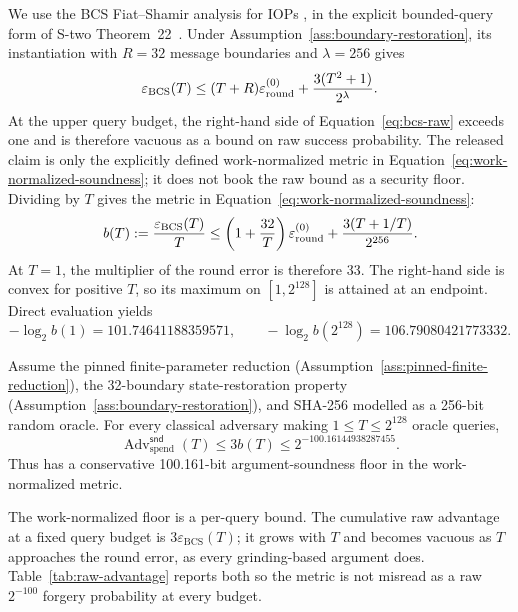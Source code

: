 We use the BCS Fiat--Shamir analysis for IOPs
\cite{BenSassonChiesaSpooner2016}, in the explicit bounded-query form of
S-two Theorem~22~\cite{CarmonEtAl2026Stwo}.  Under
Assumption~\ref{ass:boundary-restoration}, its instantiation with \(R=32\)
message boundaries and \(\lambda=256\) gives
\begin{equation}
 \varepsilon_{\mathrm{BCS}}(T)
 \le (T+R)\varepsilon_{\rm round}^{(0)}
       +\frac{3(T^2+1)}{2^\lambda}.
 \label{eq:bcs-raw}
\end{equation}
At the upper query budget, the right-hand side of
Equation~\eqref{eq:bcs-raw} exceeds one and is therefore vacuous as a bound
on raw success probability.  The released claim is only the explicitly
defined work-normalized metric in
Equation~\eqref{eq:work-normalized-soundness}; it does not book the raw bound
as a security floor.
Dividing by \(T\) gives the metric in
Equation~\eqref{eq:work-normalized-soundness}:
\begin{equation}
 b(T):=\frac{\varepsilon_{\mathrm{BCS}}(T)}{T}
 \le
 \left(1+\frac{32}{T}\right)\varepsilon_{\rm round}^{(0)}
 +\frac{3(T+1/T)}{2^{256}}.
 \label{eq:bcs-normalized}
\end{equation}
At \(T=1\), the multiplier of the round error is therefore 33.  The
right-hand side is convex for positive \(T\), so its maximum on
\([1,2^{128}]\) is attained at an endpoint.  Direct evaluation yields
\[
 -\log_2 b(1)=101.74641188359571,
 \qquad
 -\log_2 b(2^{128})=106.79080421773332.
\]

\begin{theorem}
\label{thm:bcs-soundness}
Assume the pinned finite-parameter reduction
(Assumption~\ref{ass:pinned-finite-reduction}), the 32-boundary
state-restoration property (Assumption~\ref{ass:boundary-restoration}), and
SHA-256 modelled as a 256-bit random oracle.  For every classical adversary making
\(1\le T\le2^{128}\) oracle queries,
\[
 \operatorname{Adv}^{\mathsf{snd}}_{\mathrm{spend}}(T)
 \le 3b(T)\le 2^{-100.16144938287455}.
\]
Thus \Profile{} has a conservative 100.161-bit argument-soundness floor in
the work-normalized metric.
\end{theorem}

The work-normalized floor is a per-query bound.  The cumulative raw advantage
at a fixed query budget is \(3\varepsilon_{\mathrm{BCS}}(T)\); it grows with
\(T\) and becomes vacuous as \(T\) approaches the round error, as every
grinding-based argument does.  Table~\ref{tab:raw-advantage} reports both so
the metric is not misread as a raw \(2^{-100}\) forgery probability at every
budget.

